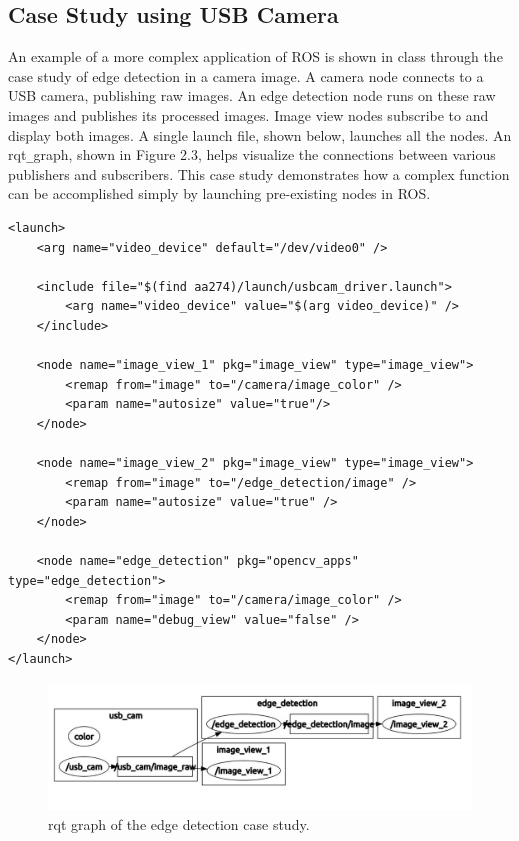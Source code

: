 \documentclass[twoside]{article}
\begin{document}
\subsection{Case Study using USB Camera}
An example of a more complex application of ROS is shown in class through the case study of edge detection in a camera image. A camera node connects to a USB camera, publishing raw images. An edge detection node runs on these raw images and publishes its processed images. Image view nodes subscribe to and display both images. A single launch file, shown below, launches all the nodes. An rqt\verb|_|graph, shown in Figure 2.3, helps visualize the connections between various publishers and subscribers. This case study demonstrates how a complex function can be accomplished simply by launching pre-existing nodes in ROS. 
 
\begin{verbatim}
<launch>
    <arg name="video_device" default="/dev/video0" />

    <include file="$(find aa274)/launch/usbcam_driver.launch">
        <arg name="video_device" value="$(arg video_device)" />
    </include>

    <node name="image_view_1" pkg="image_view" type="image_view">
        <remap from="image" to="/camera/image_color" />
        <param name="autosize" value="true"/>
    </node>

    <node name="image_view_2" pkg="image_view" type="image_view">
        <remap from="image" to="/edge_detection/image" />
        <param name="autosize" value="true" />
    </node>

    <node name="edge_detection" pkg="opencv_apps" type="edge_detection">
        <remap from="image" to="/camera/image_color" />
        <param name="debug_view" value="false" />
    </node>
</launch>
\end{verbatim}

\begin{figure}[ht]
\centering
\includegraphics[width=1\textwidth]{USBCamera}
\caption{rqt graph of the edge detection case study.}
\end{figure}
\end{document}
